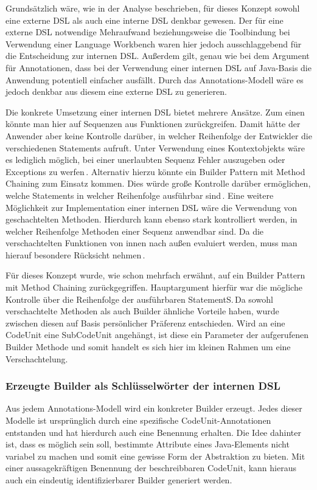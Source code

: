 \documentclass[12pt,oneside,a4paper,parskip]{scrbook}
\begin{document}
Grundsätzlich wäre, wie in der Analyse beschrieben, für dieses Konzept sowohl eine externe DSL als auch eine interne DSL denkbar gewesen. Der für eine externe DSL notwendige Mehraufwand beziehungsweise die Toolbindung bei Verwendung einer Language Workbench waren hier jedoch ausschlaggebend für die Entscheidung zur internen DSL. Außerdem gilt, genau wie bei dem Argument für Annotationen, dass bei der Verwendung einer internen DSL auf Java-Basis die Anwendung potentiell einfacher ausfällt. Durch das Annotations-Modell wäre es jedoch denkbar aus diesem eine externe DSL zu generieren.

Die konkrete Umsetzung einer internen DSL bietet mehrere Ansätze. Zum einen könnte man hier auf Sequenzen aus Funktionen zurückgreifen. Damit hätte der Anwender aber keine Kontrolle darüber, in welcher Reihenfolge der Entwickler die verschiedenen Statements aufruft. Unter Verwendung eines Kontextobjekts wäre es lediglich möglich, bei einer unerlaubten Sequenz Fehler auszugeben oder Exceptions zu werfen\,\cite[S.\,351ff.]{fowler2010}. Alternativ hierzu könnte ein Builder Pattern mit Method Chaining zum Einsatz kommen. Dies würde große Kontrolle darüber ermöglichen, welche Statements in welcher Reihenfolge ausführbar sind\,\cite[S.\,343ff.]{fowler2010}. Eine weitere Möglichkeit zur Implementation einer internen DSL wäre die Verwendung von geschachtelten Methoden. Hierdurch kann ebenso stark kontrolliert werden, in welcher Reihenfolge Methoden einer Sequenz anwendbar sind. Da die verschachtelten Funktionen von innen nach außen evaluiert werden, muss man hierauf besondere Rücksicht nehmen\,\cite[S.\,357ff.]{fowler2010}.

Für dieses Konzept wurde, wie schon mehrfach erwähnt, auf ein Builder Pattern mit Method Chaining zurückgegriffen. Hauptargument hierfür war die mögliche Kontrolle über die Reihenfolge der ausführbaren StatementS.\,Da sowohl verschachtelte Methoden als auch Builder ähnliche Vorteile haben, wurde zwischen diesen auf Basis persönlicher Präferenz entschieden. Wird an eine CodeUnit eine SubCodeUnit angehängt, ist diese ein Parameter der aufgerufenen Builder Methode und somit handelt es sich hier im kleinen Rahmen um eine Verschachtelung.

\subsubsection{Erzeugte Builder als Schlüsselwörter der internen DSL}

Aus jedem Annotations-Modell wird ein konkreter Builder erzeugt. Jedes dieser Modelle ist ursprünglich durch eine spezifische CodeUnit-Annotationen entstanden und hat hierdurch auch eine Benennung erhalten. Die Idee dahinter ist, dass es möglich sein soll, bestimmte Attribute eines Java-Elements nicht variabel zu machen und somit eine gewisse Form der Abstraktion zu bieten. Mit einer aussagekräftigen Benennung der beschreibbaren CodeUnit, kann hieraus auch ein eindeutig identifizierbarer Builder generiert werden.
\end{document}
